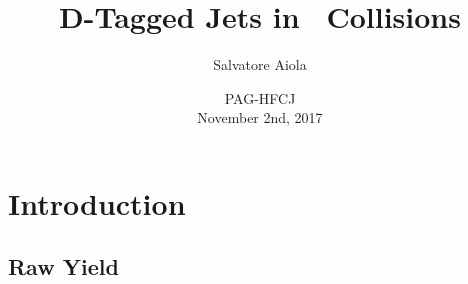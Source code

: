 \documentclass[xcolor={usenames,dvipsnames}]{beamer}
\title[D-Tagged Jets in \pp] %
{D-Tagged Jets in \pp\ Collisions}
\author[Salvatore Aiola]%
{Salvatore Aiola}
\institute[Yale University] %
{Yale University}
\date[PAG-HFCJ - Nov. 2nd, 2017] %
{PAG-HFCJ \\
November 2nd, 2017}
\begin{document}
\begin{frame}
  \titlepage
\end{frame}








\section{Introduction}

\subsection{Raw Yield}
\end{document}
